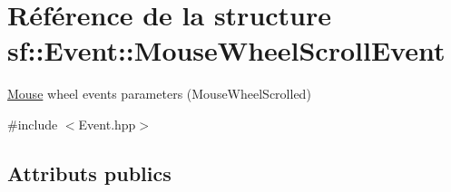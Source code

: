 \hypertarget{structsf_1_1Event_1_1MouseWheelScrollEvent}{}\section{Référence de la structure sf\+:\+:Event\+:\+:Mouse\+Wheel\+Scroll\+Event}
\label{structsf_1_1Event_1_1MouseWheelScrollEvent}


\hyperlink{classsf_1_1Mouse}{Mouse} wheel events parameters (Mouse\+Wheel\+Scrolled)  




{\ttfamily \#include $<$Event.\+hpp$>$}

\subsection*{Attributs publics}
